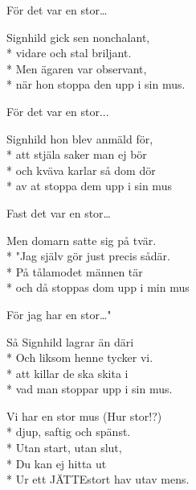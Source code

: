 \begin{SongText}
\begin{SongVerse}
För det var en stor…
\end{SongVerse}
\begin{SongVerse}
Signhild gick sen nonchalant,\\*%
vidare och stal briljant.\\*%
Men ägaren var observant,\\*%
när hon stoppa den upp i sin mus.
\end{SongVerse}
\begin{SongVerse}
För det var en stor...
\end{SongVerse}
\begin{SongVerse}
Signhild hon blev anmäld för,\\*%
att stjäla saker man ej bör\\*%
och kväva karlar så dom dör\\*%
av at stoppa dem upp i sin mus
\end{SongVerse}
\begin{SongVerse}
Fast det var en stor…
\end{SongVerse}
\begin{SongVerse}
Men domarn satte sig på tvär.\\*%
"Jag själv gör just precis sådär.\\*%
På tålamodet männen tär\\*%
och då stoppas dom upp i min mus
\end{SongVerse}
\begin{SongVerse}
För jag har en stor…"
\end{SongVerse}
\begin{SongVerse}
Så Signhild lagrar än däri\\*%
Och liksom henne tycker vi.\\*%
att killar de ska skita i\\*%
vad man stoppar upp i sin mus.
\end{SongVerse}
\begin{SongVerse}
Vi har en stor mus (Hur stor!?)\\*%
djup, saftig och spänst.\\*%
Utan start, utan slut,\\*%
Du kan ej hitta ut\\*%
Ur ett JÄTTEstort hav utav mens.
\end{SongVerse}
\end{SongText}
